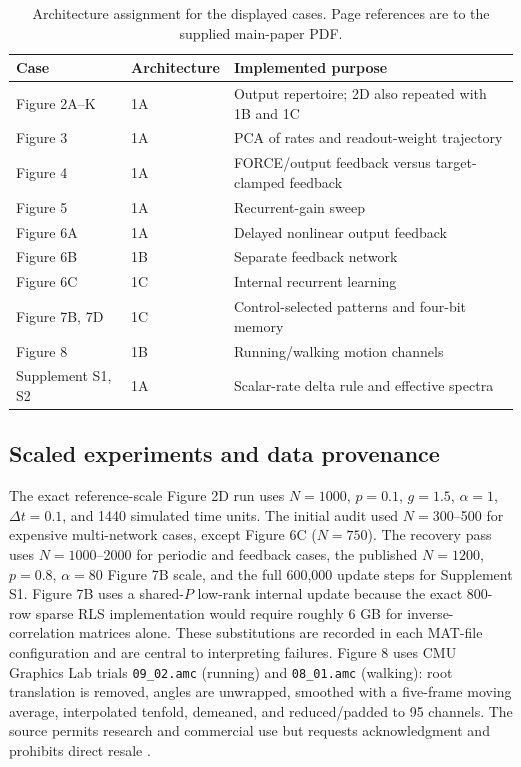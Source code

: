 \begin{table}[!htbp]
\centering
\small
\caption{Architecture assignment for the displayed cases. Page references are to the supplied main-paper PDF.}
\begin{tabularx}{\linewidth}{@{}l l X@{}}
\toprule
Case & Architecture & Implemented purpose \\
\midrule
Figure 2A--K & 1A & Output repertoire; 2D also repeated with 1B and 1C \\
Figure 3 & 1A & PCA of rates and readout-weight trajectory \\
Figure 4 & 1A & FORCE/output feedback versus target-clamped feedback \\
Figure 5 & 1A & Recurrent-gain sweep \\
Figure 6A & 1A & Delayed nonlinear output feedback \\
Figure 6B & 1B & Separate feedback network \\
Figure 6C & 1C & Internal recurrent learning \\
Figure 7B, 7D & 1C & Control-selected patterns and four-bit memory \\
Figure 8 & 1B & Running/walking motion channels \\
Supplement S1, S2 & 1A & Scalar-rate delta rule and effective spectra \\
\bottomrule
\end{tabularx}
\end{table}

\subsection{Scaled experiments and data provenance}
The exact reference-scale Figure 2D run uses $N=1000$, $p=0.1$, $g=1.5$, $\alpha=1$, $\Delta t=0.1$, and 1440 simulated time units. The initial audit used $N=300$--500 for expensive multi-network cases, except Figure 6C ($N=750$). The recovery pass uses $N=1000$--2000 for periodic and feedback cases, the published $N=1200$, $p=0.8$, $\alpha=80$ Figure 7B scale, and the full 600,000 update steps for Supplement S1. Figure 7B uses a shared-$P$ low-rank internal update because the exact 800-row sparse RLS implementation would require roughly 6 GB for inverse-correlation matrices alone. These substitutions are recorded in each MAT-file configuration and are central to interpreting failures. Figure 8 uses CMU Graphics Lab trials \texttt{09\_02.amc} (running) and \texttt{08\_01.amc} (walking): root translation is removed, angles are unwrapped, smoothed with a five-frame moving average, interpolated tenfold, demeaned, and reduced/padded to 95 channels. The source permits research and commercial use but requests acknowledgment and prohibits direct resale \cite{cmu_mocap}.

